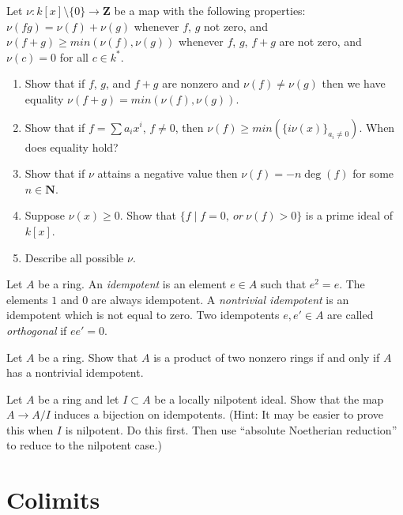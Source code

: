 \begin{exercise}
\label{exercise-valuation}
Let $\nu : k[x]\setminus \{0\}  \to {\mathbf Z}$ be a map
with the following properties: $\nu(fg) = \nu(f) + \nu(g)$ whenever
$f$, $g$ not zero, and  $\nu(f + g) \geq min(\nu(f), \nu(g))$ whenever
$f$, $g$, $f + g$ are not zero, and $\nu(c) = 0$ for all $c\in k^*$.
\begin{enumerate}
\item Show that if $f$, $g$, and $f + g$ are nonzero and
$\nu(f) \not = \nu(g)$ then we have equality $\nu(f + g) = min(\nu(f), \nu(g))$.
\item Show that if $f = \sum a_i x^i$, $f\not = 0$, then
$\nu(f) \geq min(\{i\nu(x)\}_{a_i\not = 0})$. When does equality hold?
\item Show that if $\nu$ attains a negative value then
$\nu(f) = -n \deg(f)$ for some $n\in {\mathbf N}$.
\item Suppose $\nu(x) \geq 0$. Show that
$\{f \mid f = 0, \ or\ \nu(f) > 0\}$ is a prime ideal of $k[x]$.
\item Describe all possible $\nu$.
\end{enumerate}
\end{exercise}


\noindent
Let $A$ be a ring. An {\it idempotent} is an element $e \in A$
such that $e^2 = e$. The elements $1$ and $0$ are always idempotent.
A {\it nontrivial idempotent} is an idempotent which is not
equal to zero. Two idempotents $e, e' \in A$ are called {\it orthogonal}
if $ee' = 0$.

\begin{exercise}
\label{exercise-product}
Let $A$ be a ring. Show that $A$ is a product of two nonzero rings if
and only if $A$ has a nontrivial idempotent.
\end{exercise}

\begin{exercise}
\label{exercise-lift-idempotents}
Let $A$ be a ring and let $I \subset A$ be a locally nilpotent ideal.
Show that the map $A \to A/I$ induces a bijection on idempotents.
(Hint: It may be easier to prove this when $I$ is nilpotent. Do this first.
Then use ``absolute Noetherian reduction'' to reduce to the nilpotent case.)
\end{exercise}








\section{Colimits}
\label{section-colimits}


